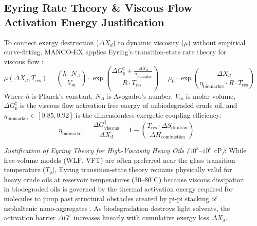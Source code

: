 \documentclass[review,12pt]{elsarticle}
\begin{document}
\subsection{Eyring Rate Theory \& Viscous Flow Activation Energy Justification}
To connect exergy destruction ($\Delta X_d$) to dynamic viscosity ($\mu$) without empirical curve-fitting, MANCO-EX applies Eyring's transition-state rate theory for viscous flow \citep{eyring1936viscosity, macias2009eyring, andrade2018eyring}:
\begin{equation}
    \mu(\Delta X_d, T_{\text{res}}) = \left( \frac{h \cdot N_A}{V_m} \right) \cdot \exp \left( \frac{\Delta G^\ddagger_0 + \frac{\Delta X_d}{\eta_{\text{biomarker}}}}{R \cdot T_{\text{res}}} \right) = \mu_0 \cdot \exp \left( \frac{\Delta X_d}{\eta_{\text{biomarker}} \cdot R \cdot T_{\text{res}}} \right)
\end{equation}
Where $h$ is Planck's constant, $N_A$ is Avogadro's number, $V_m$ is molar volume, $\Delta G^\ddagger_0$ is the viscous flow activation free energy of unbiodegraded crude oil, and $\eta_{\text{biomarker}} \in [0.85, 0.92]$ is the dimensionless exergetic coupling efficiency:
\begin{equation}
    \eta_{\text{biomarker}} = \frac{\Delta G^\ddagger_{\text{viscous}}}{\Delta X_d} = 1 - \left( \frac{T_{\text{res}} \cdot \Delta S_{\text{dilution}}}{\Delta H_{\text{combustion}}} \right)
\end{equation}

\emph{Justification of Eyring Theory for High-Viscosity Heavy Oils ($10^3\text{--}10^5\text{ cP}$)}: While free-volume models (WLF, VFT) are often preferred near the glass transition temperature ($T_g$), Eyring transition-state theory remains physically valid for heavy crude oils at reservoir temperatures ($30\text{--}80^\circ\text{C}$) because viscous dissipation in biodegraded oils is governed by the thermal activation energy required for molecules to jump past structural obstacles created by pi-pi stacking of asphaltenic nano-aggregates \citep{macias2009eyring, miadonye2024activation}. As biodegradation destroys light solvents, the activation barrier $\Delta G^\ddagger$ increases linearly with cumulative exergy loss $\Delta X_d$.
\end{document}
